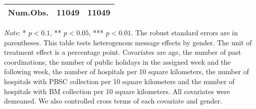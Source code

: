 \documentclass[12pt, a4paper]{article}
\begin{document}
\begin{table}[H]
\begin{threeparttable}
\begin{tabular}[t]{>{\raggedright\arraybackslash}p{30em}cc}
Num.Obs. & \num{11049} & \num{11049}\\
\bottomrule
\end{tabular}
\begin{tablenotes}
\item \emph{Note}: * $p < 0.1$, ** $p < 0.05$, *** $p < 0.01$. The robust standard errors are in parentheses. This table tests heterogenous message effects by gender. The unit of treatment effect is a percentage point. Covariates are age, the number of past coordinations, the number of public holidays in the assigned week and the following week, the number of hospitals per 10 square kilometers, the number of hospitals with PBSC collection per 10 square kilometers and the number of hospitals with BM collection per 10 square kilometers. All covariates were demeaned. We also controlled cross terms of each covariate and gender.
\end{tablenotes}
\end{threeparttable}
\end{table}
\end{document}
